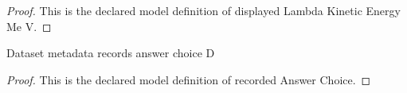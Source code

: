 \begin{proof}
  This is the declared model definition of displayed Lambda Kinetic Energy Me V.
\end{proof}
\begin{definition}
  \label{def:physics:phyx-mini-0554:phyxminiproblems-problemphyxmini0554-recordedanswerchoice}
  Dataset metadata records answer choice D
\end{definition}
\begin{proof}
  This is the declared model definition of recorded Answer Choice.
\end{proof}
